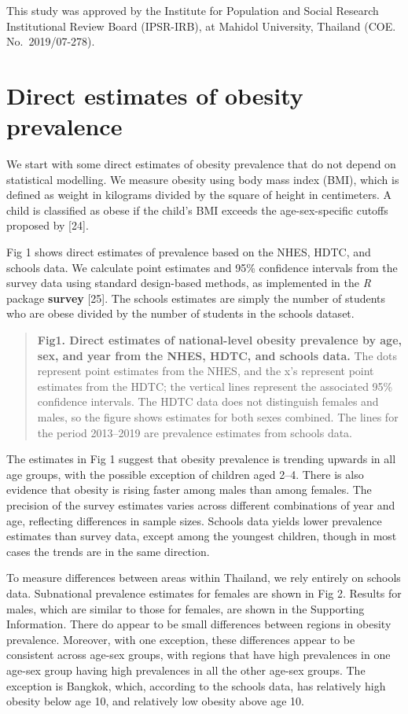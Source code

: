 \documentclass[10pt,letterpaper]{article}
\begin{document}
This study was approved by the Institute for Population and Social
Research Institutional Review Board (IPSR-IRB), at Mahidol University,
Thailand (COE. No.~2019/07-278).

\hypertarget{direct-estimates-of-obesity-prevalence}{%
\section{Direct estimates of obesity
prevalence}\label{direct-estimates-of-obesity-prevalence}}

We start with some direct estimates of obesity prevalence that do not
depend on statistical modelling. We measure obesity using body mass
index (BMI), which is defined as weight in kilograms divided by the
square of height in centimeters. A child is classified as obese if the
child's BMI exceeds the age-sex-specific cutoffs proposed by {[}24{]}.

Fig 1 shows direct estimates of prevalence based on the NHES, HDTC, and
schools data. We calculate point estimates and 95\% confidence intervals
from the survey data using standard design-based methods, as implemented
in the \emph{R} package \textbf{survey} {[}25{]}. The schools estimates
are simply the number of students who are obese divided by the number of
students in the schools dataset.

\begin{quote}
\textbf{Fig1. Direct estimates of national-level obesity prevalence by age, sex, and year from the NHES, HDTC, and schools data.} The dots represent point estimates from the NHES, and the x's represent point estimates from the HDTC; the vertical lines represent the associated 95\% confidence intervals. The HDTC data does not distinguish females and males, so the figure shows estimates for both sexes combined. The lines for the period 2013--2019 are prevalence estimates from schools data.
\end{quote}

The estimates in Fig 1 suggest that obesity prevalence is trending
upwards in all age groups, with the possible exception of children aged
2--4. There is also evidence that obesity is rising faster among males
than among females. The precision of the survey estimates varies across
different combinations of year and age, reflecting differences in sample
sizes. Schools data yields lower prevalence estimates than survey data,
except among the youngest children, though in most cases the trends are
in the same direction.

To measure differences between areas within Thailand, we rely entirely
on schools data. Subnational prevalence estimates for females are shown
in Fig 2. Results for males, which are similar to those for females, are
shown in the Supporting Information. There do appear to be small
differences between regions in obesity prevalence. Moreover, with one
exception, these differences appear to be consistent across age-sex
groups, with regions that have high prevalences in one age-sex group
having high prevalences in all the other age-sex groups. The exception
is Bangkok, which, according to the schools data, has relatively high
obesity below age 10, and relatively low obesity above age 10.
\end{document}
